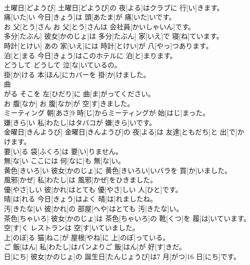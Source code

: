 \documentclass[8pt]{extreport}
\begin{document}
\begin{CJK}{UTF8}{min}
\\	土曜日[どようび]	土曜日[どようび]の 夜[よる]はクラブに 行[い]きます。		
\\	痛[いた]い	今日[きょう]は 頭[あたま]が 痛[いた]いです。		
\\	お 父[とう]さん	お 父[とう]さんは 会社員[かいしゃいん]です。		
\\	多分[たぶん]	彼女[かのじょ]は 多分[たぶん] 家[いえ]で 寝[ね]ています。		
\\	時計[とけい]	あの 家[いえ]には 時計[とけい]が 八[やっ]つあります。		
\\	泊[と]まる	今日[きょう]はこのホテルに 泊[と]まります。		
\\	どうして	どうして 泣[な]いているの。		
\\	掛[か]ける	本[ほん]にカバーを 掛[か]けました。		
\\	曲
\\	[ま]がる	そこを 左[ひだり]に 曲[ま]がってください。		
\\	お 腹[なか]	お 腹[なか]が 空[す]きました。		
\\	ミーティング	朝[あさ]9 時[じ]からミーティングが 始[はじ]まった。		
\\	嫌[きら]い	私[わたし]はタバコが 嫌[きら]いです。		
\\	金曜日[きんようび]	金曜日[きんようび]の 夜[よる]は 友達[ともだち]と 出[で]かけます。		
\\	要[い]る	袋[ふくろ]は 要[い]りません。		
\\	無[な]い	ここには 何[なに]も 無[な]い。		
\\	黄色[きいろ]い	彼女[かのじょ]に 黄色[きいろい]いバラを 買[か]いました。		
\\	風邪[かぜ]	私[わたし]は 風邪[かぜ]をひきました。		
\\	優[やさ]しい	彼[かれ]はとても 優[やさ]しい 人[ひと]です。		
\\	晴[は]れる	今日[きょう]はよく 晴[は]れましたね。		
\\	汚[きたな]い	彼[かれ]の 部屋[へや]はとても 汚[きたな]い。		
\\	茶色[ちゃいろ]	彼女[かのじょ]は 茶色[ちゃいろ]の 靴[くつ]を 履[は]いています。		
\\	空[す]く	レストランは 空[す]いていました。		
\\	上[のぼ]る	猫[ねこ]が 屋根[やね]に 上[のぼ]っている。		
\\	ご 飯[はん]	私[わたし]はパンよりご 飯[はん]が 好[す]きだ。		
\\	日[にち]	彼女[かのじょ]の 誕生日[たんじょうび]は7 月[がつ]16 日[にち]です。		

\end{CJK}
\end{document}
